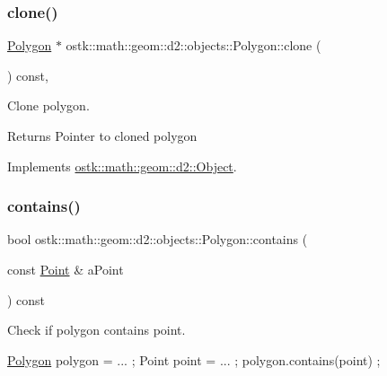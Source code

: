 \subsubsection{\texorpdfstring{clone()}{clone()}}
{\footnotesize\ttfamily \hyperlink{classostk_1_1math_1_1geom_1_1d2_1_1objects_1_1_polygon}{Polygon} $\ast$ ostk\+::math\+::geom\+::d2\+::objects\+::\+Polygon\+::clone (\begin{DoxyParamCaption}{ }\end{DoxyParamCaption}) const\hspace{0.3cm}{\ttfamily [override]}, {\ttfamily [virtual]}}



Clone polygon. 

\begin{DoxyReturn}{Returns}
Pointer to cloned polygon 
\end{DoxyReturn}


Implements \hyperlink{classostk_1_1math_1_1geom_1_1d2_1_1_object_a98dedc6792aef35308966ca768eb3e14}{ostk\+::math\+::geom\+::d2\+::\+Object}.

\mbox{\label{classostk_1_1math_1_1geom_1_1d2_1_1objects_1_1_polygon_aa9f49a046d832821a8b26064b3cf2158}} 
\subsubsection{\texorpdfstring{contains()}{contains()}\hspace{0.1cm}{\footnotesize\ttfamily [1/2]}}
{\footnotesize\ttfamily bool ostk\+::math\+::geom\+::d2\+::objects\+::\+Polygon\+::contains (\begin{DoxyParamCaption}\item[{const \hyperlink{classostk_1_1math_1_1geom_1_1d2_1_1objects_1_1_point}{Point} \&}]{a\+Point }\end{DoxyParamCaption}) const}



Check if polygon contains point. 


\begin{DoxyCode}
\hyperlink{classostk_1_1math_1_1geom_1_1d2_1_1objects_1_1_polygon_adaf9ef564754ab10ed3dd0d5fa0d90ea}{Polygon} polygon = ... ;
Point point = ... ;
polygon.contains(point) ;
\end{DoxyCode}



